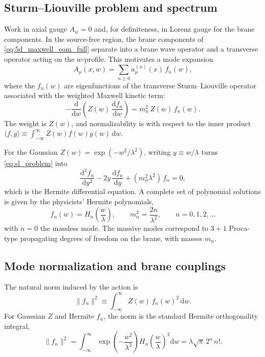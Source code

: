 \documentclass[11pt]{article}
\newcommand{\dd}{\mathrm d}
\newcommand{\A}{A}
\newcommand{\Z}{Z}
\newcommand{\lam}{\lambda}      %
\begin{document}
\subsection{Sturm--Liouville problem and spectrum}
\label{sec:kk_spectrum}

Work in axial gauge \(\A_w=0\) and, for definiteness, in Lorenz gauge for the brane
components. In the source-free region, the brane components of
\cref{eq:5d_maxwell_eom_full} separate into a brane wave operator and a transverse
operator acting on the \(w\)-profile. This motivates a mode expansion
\begin{equation}
  \A_\mu(x,w) = \sum_{n\ge 0} a^{(n)}_\mu(x)\,f_n(w),
  \label{eq:kk_expansion}
\end{equation}
where the \(f_n(w)\) are eigenfunctions of the transverse Sturm--Liouville
operator associated with the weighted Maxwell kinetic term:
\begin{equation}
  -\frac{\dd}{\dd w}\!\left(\Z(w)\,\frac{\dd f_n}{\dd w}\right)
  = m_n^2\,\Z(w)\,f_n(w).
  \label{eq:sl_problem}
\end{equation}
The weight is \(\Z(w)\), and normalizability is with respect to the inner product\\
\(\langle f,g\rangle\equiv \int_{-\infty}^{\infty}\Z(w) f(w)g(w)\,\dd w\).

For the Gaussian \(\Z(w)=\exp(-w^2/\lam^2)\), writing \(y\equiv w/\lam\) turns
\cref{eq:sl_problem} into
\begin{equation}
  \frac{\dd^2 f_n}{\dd y^2} - 2y\,\frac{\dd f_n}{\dd y} + (m_n^2\lam^2)\,f_n = 0,
\end{equation}
which is the Hermite differential equation. A complete set of polynomial
solutions is given by the physicists' Hermite polynomials,
\begin{equation}
  f_n(w) = H_n\!\left(\frac{w}{\lam}\right),
  \qquad
  m_n^2 = \frac{2n}{\lam^2},
  \qquad n=0,1,2,\ldots
  \label{eq:hermite_spectrum}
\end{equation}
with \(n=0\) the massless mode. The massive modes correspond to \(3+1\) Proca-type
propagating degrees of freedom on the brane, with masses \(m_n\).

\subsection{Mode normalization and brane couplings}
\label{sec:kk_couplings}

The natural norm induced by the action is
\begin{equation}
  \|f_n\|^2 \equiv \int_{-\infty}^{\infty}\Z(w)\,f_n(w)^2\,\dd w.
\end{equation}
For Gaussian \(\Z\) and Hermite \(f_n\), the norm is the standard Hermite orthogonality
integral,
\begin{equation}
  \|f_n\|^2
  = \int_{-\infty}^{\infty}\exp\!\left(-\frac{w^2}{\lam^2}\right)
    H_n\!\left(\frac{w}{\lam}\right)^2 \dd w
  = \lam\sqrt{\pi}\,2^n\,n!.
  \label{eq:hermite_norm}
\end{equation}
\end{document}
